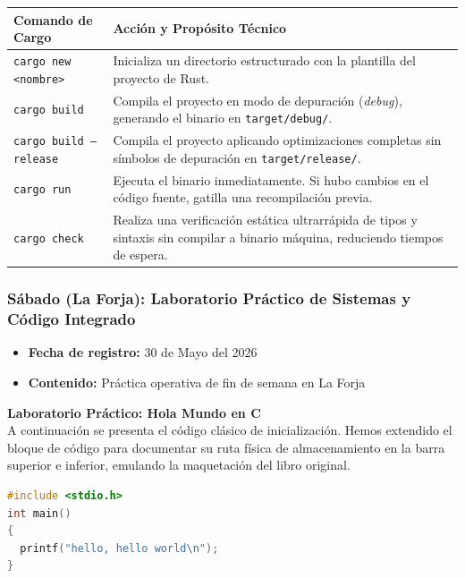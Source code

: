 \documentclass[11pt, a4paper]{article}
\begin{document}
\begin{center}
\small
\begin{tabular}{lp{9.5cm}}
\toprule
\textbf{Comando de Cargo} & \textbf{Acción y Propósito Técnico} \\
\midrule
\texttt{cargo new <nombre>} & Inicializa un directorio estructurado con la plantilla del proyecto de Rust. \\
\texttt{cargo build} & Compila el proyecto en modo de depuración (\textit{debug}), generando el binario en \texttt{target/debug/}. \\
\texttt{cargo build --release} & Compila el proyecto aplicando optimizaciones completas sin símbolos de depuración en \texttt{target/release/}. \\
\texttt{cargo run} & Ejecuta el binario inmediatamente. Si hubo cambios en el código fuente, gatilla una recompilación previa. \\
\texttt{cargo check} & Realiza una verificación estática ultrarrápida de tipos y sintaxis sin compilar a binario máquina, reduciendo tiempos de espera. \\
\bottomrule
\end{tabular}
\end{center}

\subsubsection{Sábado (La Forja): Laboratorio Práctico de Sistemas y Código Integrado}
\begin{itemize}
  \item[] \textbf{Fecha de registro:} 30 de Mayo del 2026
  \item[] \textbf{Contenido:} Práctica operativa de fin de semana en La Forja
\end{itemize}

\noindent\textbf{Laboratorio Práctico: Hola Mundo en C}\\[0.5em]
A continuación se presenta el código clásico de inicialización. Hemos extendido el bloque de código para documentar su ruta física de almacenamiento en la barra superior e inferior, emulando la maquetación del libro original.

\begin{lstlisting}[language=C, caption={Hola mundo en C}, path={/Ejercicios/hello/hello.c}]
#include <stdio.h>
int main()
{
  printf("hello, hello world\n");
}
\end{lstlisting}
\end{document}
